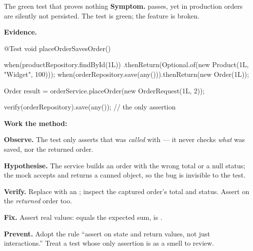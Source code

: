 \begin{debuglab}{The green test that proves nothing}
\textbf{Symptom.}  passes, yet in production orders are silently not persisted. The test is green; the feature is broken.

\smallskip\textbf{Evidence.}
\begin{javabox}
@Test
void placeOrderSavesOrder() {
  when(productRepository.findById(1L))
      .thenReturn(Optional.of(new Product(1L, "Widget", 100)));
  when(orderRepository.save(any())).thenReturn(new Order(1L));

  Order result = orderService.placeOrder(new OrderRequest(1L, 2));

  verify(orderRepository).save(any());   // the only assertion
}
\end{javabox}

\textbf{Work the method:}
\begin{tickcheck}
  \item \textbf{Observe.} The test only asserts that  was \emph{called} with  --- it never checks \emph{what} was saved, nor the returned order.
  \item \textbf{Hypothesise.} The service builds an order with the wrong total or a null status; the mock accepts  and returns a canned object, so the bug is invisible to the test.
  \item \textbf{Verify.} Replace  with an ; inspect the captured order's total and status. Assert on the \emph{returned} order too.
  \item \textbf{Fix.} Assert real values:  equals the expected sum,  is .
  \item \textbf{Prevent.} Adopt the rule ``assert on state and return values, not just interactions.'' Treat a test whose only assertion is  as a smell to review.
\end{tickcheck}
\end{debuglab}

